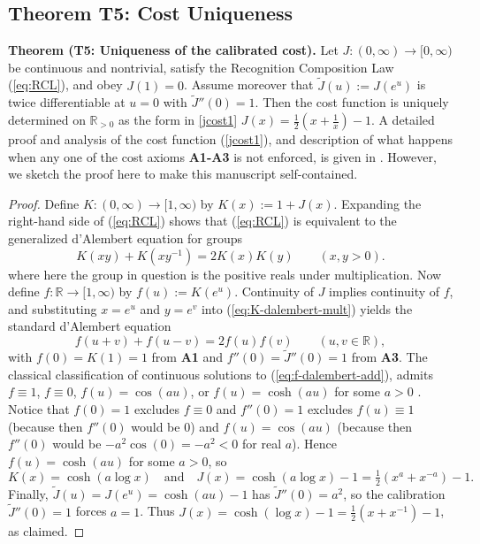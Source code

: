 \documentclass[11pt,a4paper]{article}
\begin{document}
\subsection{Theorem T5: Cost Uniqueness}
\textbf{Theorem (T5: Uniqueness of the calibrated cost).}
Let $J:(0,\infty)\to[0,\infty)$ be continuous and nontrivial, satisfy the Recognition Composition Law (\ref{eq:RCL}), and obey $J(1)=0$. Assume moreover that $\widetilde{J}(u):=J(e^{u})$ is twice differentiable at $u=0$ with $\widetilde{J}''(0)=1$. Then the cost function is uniquely determined on $\mathbb{R}_{>0}$ as the form in \ref{jcost1} $J(x) = \frac{1}{2}\left(x + \frac{1}{x}\right) - 1$.
A detailed proof and analysis of the cost function (\ref{jcost1}), and description of what happens when any one of the cost axioms \textbf{A1-A3} is not enforced, is given in \cite{uniqueness}. However, we sketch the proof here to make this manuscript self-contained.
\begin{proof}
Define $K:(0,\infty)\to[1,\infty)$ by $K(x):=1+J(x)$. Expanding the right-hand side of (\ref{eq:RCL}) shows that (\ref{eq:RCL}) is equivalent to the generalized d'Alembert equation for groups \cite{Kannappan1968TheFE,groupdalambert2013}
\begin{equation}
    K(xy)+K(x y^{-1})=2K(x)K(y)\qquad(x,y>0).
    \label{eq:K-dalembert-mult}
\end{equation}
where here the group in question is the positive reals under multiplication.
Now define $f:\mathbb{R}\to[1,\infty)$ by $f(u):=K(e^{u})$. Continuity of $J$ implies continuity of $f$, and substituting $x=e^{u}$ and $y=e^{v}$ into (\ref{eq:K-dalembert-mult}) yields the standard d'Alembert equation \cite{aczel1966lectures}
\begin{equation}
    f(u+v)+f(u-v)=2f(u)f(v)\qquad(u,v\in\mathbb{R}),
    \label{eq:f-dalembert-add}
\end{equation}
with $f(0)=K(1)=1$ from \textbf{A1} and $f''(0)=\widetilde{J}''(0)=1$ from \textbf{A3}.
The classical classification of continuous solutions to (\ref{eq:f-dalembert-add}), admits $f\equiv 1$, $f\equiv0$, $f(u)=\cos(au)$, or $f(u)=\cosh(au)$ for some $a>0$ \cite{Aczel_Dhombres_1989}. Notice that $f(0)=1$ excludes $f\equiv0$ and $f''(0)=1$ excludes $f(u)\equiv1$ (because then $f''(0)$ would be $0$) and $f(u)=\cos(au)$ (because then $f''(0)$ would be $-a^2\cos(0)=-a^2<0$ for real $a$).  Hence $f(u)=\cosh(au)$ for some $a>0$, so
\begin{equation}
K(x)=\cosh(a\log x)\quad\text{and}\quad
J(x)=\cosh(a\log x)-1=\tfrac12(x^{a}+x^{-a})-1.
\end{equation}
Finally, $\widetilde{J}(u)=J(e^{u})=\cosh(au)-1$ has $\widetilde{J}''(0)=a^{2}$, so the calibration $\widetilde{J}''(0)=1$ forces $a=1$.
Thus $J(x)=\cosh(\log x)-1=\frac12(x+x^{-1})-1$, as claimed.

\end{proof}
\end{document}
